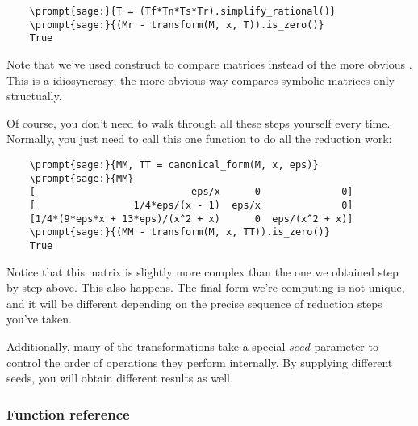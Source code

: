 \documentclass[12pt,a4paper]{article}
\begin{document}
\begin{Verbatim}
    \prompt{sage:}{T = (Tf*Tn*Ts*Tr).simplify_rational()}
    \prompt{sage:}{(Mr - transform(M, x, T)).is_zero()}
    True
\end{Verbatim}

Note that we've used construct  to compare matrices instead of the more obvious .
This is a \sage idiosyncrasy; the more obvious way compares symbolic matrices only structually.

Of course, you don't need to walk through all these steps yourself every time.
Normally, you just need to call this one function to do all the reduction work:

\begin{Verbatim}
    \prompt{sage:}{MM, TT = canonical_form(M, x, eps)}
    \prompt{sage:}{MM}
    [                          -eps/x      0              0]
    [                 1/4*eps/(x - 1)  eps/x              0]
    [1/4*(9*eps*x + 13*eps)/(x^2 + x)      0  eps/(x^2 + x)]
    \prompt{sage:}{(MM - transform(M, x, TT)).is_zero()}
    True
\end{Verbatim}

Notice that this matrix is slightly more complex than the one we obtained step by step above.
This also happens.
The final form we're computing is not unique, and it will be different depending on the precise sequence of reduction steps you've taken.

Additionally, many of the transformations take a special $seed$ parameter to control the order of operations they perform internally.
By supplying different seeds, you will obtain different results as well.

\subsubsection{Function reference}
\end{document}

